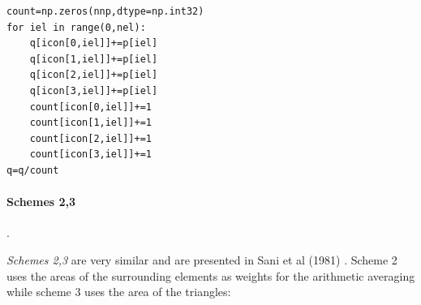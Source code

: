 \begin{lstlisting}
count=np.zeros(nnp,dtype=np.int32)  
for iel in range(0,nel):
    q[icon[0,iel]]+=p[iel]
    q[icon[1,iel]]+=p[iel]
    q[icon[2,iel]]+=p[iel]
    q[icon[3,iel]]+=p[iel]
    count[icon[0,iel]]+=1
    count[icon[1,iel]]+=1
    count[icon[2,iel]]+=1
    count[icon[3,iel]]+=1
q=q/count
\end{lstlisting}



\paragraph{Schemes 2,3}.

{\sl Schemes 2,3} are very similar and are presented in Sani et al (1981) \cite{sagl81a,sagl81b}.
Scheme 2 uses the areas of the surrounding elements as weights for the arithmetic averaging
while scheme 3 uses the area of the triangles:

